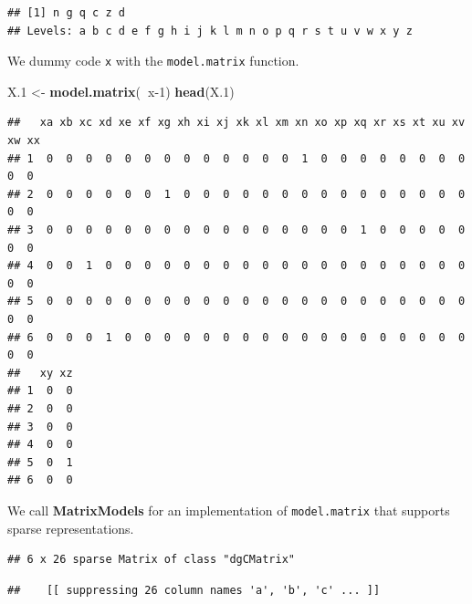 \documentclass[]{book}
\newenvironment{Shaded}{\begin{snugshade}}{\end{snugshade}}
\newcommand{\CommentTok}[1]{\textcolor[rgb]{0.56,0.35,0.01}{\textit{#1}}}
\newcommand{\DecValTok}[1]{\textcolor[rgb]{0.00,0.00,0.81}{#1}}
\newcommand{\FloatTok}[1]{\textcolor[rgb]{0.00,0.00,0.81}{#1}}
\newcommand{\KeywordTok}[1]{\textcolor[rgb]{0.13,0.29,0.53}{\textbf{#1}}}
\newcommand{\NormalTok}[1]{#1}
\newcommand{\OperatorTok}[1]{\textcolor[rgb]{0.81,0.36,0.00}{\textbf{#1}}}
\newcommand{\StringTok}[1]{\textcolor[rgb]{0.31,0.60,0.02}{#1}}
\theoremstyle{definition}
\theoremstyle{definition}
\theoremstyle{definition}
\theoremstyle{remark}
\begin{document}
\begin{verbatim}
## [1] n g q c z d
## Levels: a b c d e f g h i j k l m n o p q r s t u v w x y z
\end{verbatim}

We dummy code \texttt{x} with the \texttt{model.matrix} function.

\begin{Shaded}
\begin{Highlighting}[]
\NormalTok{X}\FloatTok{.1}\NormalTok{ <-}\StringTok{ }\KeywordTok{model.matrix}\NormalTok{(}\OperatorTok{~}\NormalTok{x}\DecValTok{-1}\NormalTok{)}
\KeywordTok{head}\NormalTok{(X}\FloatTok{.1}\NormalTok{)}
\end{Highlighting}
\end{Shaded}

\begin{verbatim}
##   xa xb xc xd xe xf xg xh xi xj xk xl xm xn xo xp xq xr xs xt xu xv xw xx
## 1  0  0  0  0  0  0  0  0  0  0  0  0  0  1  0  0  0  0  0  0  0  0  0  0
## 2  0  0  0  0  0  0  1  0  0  0  0  0  0  0  0  0  0  0  0  0  0  0  0  0
## 3  0  0  0  0  0  0  0  0  0  0  0  0  0  0  0  0  1  0  0  0  0  0  0  0
## 4  0  0  1  0  0  0  0  0  0  0  0  0  0  0  0  0  0  0  0  0  0  0  0  0
## 5  0  0  0  0  0  0  0  0  0  0  0  0  0  0  0  0  0  0  0  0  0  0  0  0
## 6  0  0  0  1  0  0  0  0  0  0  0  0  0  0  0  0  0  0  0  0  0  0  0  0
##   xy xz
## 1  0  0
## 2  0  0
## 3  0  0
## 4  0  0
## 5  0  1
## 6  0  0
\end{verbatim}

We call \textbf{MatrixModels} for an implementation of \texttt{model.matrix} that supports sparse representations.

\begin{Shaded}
\end{Shaded}

\begin{verbatim}
## 6 x 26 sparse Matrix of class "dgCMatrix"
\end{verbatim}

\begin{verbatim}
##    [[ suppressing 26 column names 'a', 'b', 'c' ... ]]
\end{verbatim}
\end{document}
